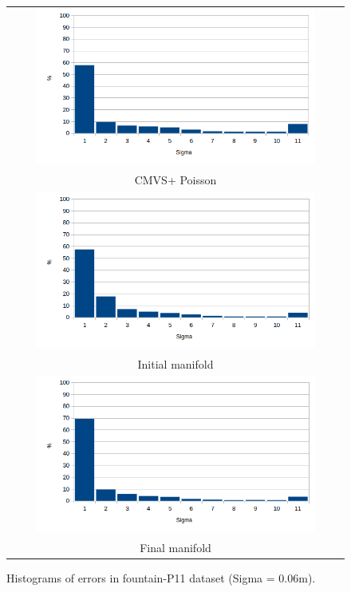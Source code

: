\begin{figure}[t]
\setlength{\tabcolsep}{1px}
\centering
\begin{tabular}{c}
\includegraphics[width=0.85\textwidth]{./img/poissonHist}\\
CMVS+ Poisson \\
\includegraphics[width=0.85\textwidth]{./img/realInitHist}\\
Initial manifold\\
\includegraphics[width=0.85\textwidth]{./img/realFinalHist}\\
Final manifold\\
\end{tabular}
\caption{Histograms of errors in fountain-P11 dataset (Sigma = 0.06m).}
\label{fig:fountainhist}
\end{figure}



